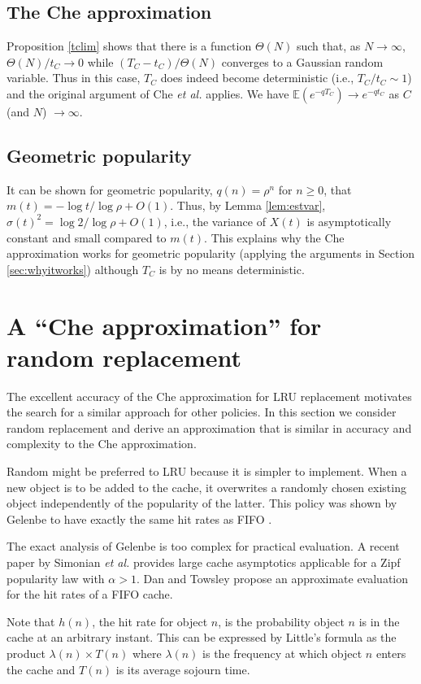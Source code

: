 \documentclass{amsart}
\def\E{{\mathbb E}}
\def\etal{{\em et al. }}
\begin{document}
\subsection{The Che approximation}
Proposition \ref{tclim} shows that there is a function $\Theta(N)$ such that, as $N\to \infty$, $\Theta(N)/t_C \to0$ while $(T_C-t_C)/\Theta(N)$ converges to a Gaussian random variable. Thus in this case, $T_C$ does indeed become deterministic (i.e., $T_C/t_C \sim 1$) and the original argument of Che \etal applies. We have $\E (e^{-qT_C}) \to e^{-qt_C}$ as $C$ (and $N$) $\to \infty$. 

\subsection{Geometric popularity}
It can be shown for geometric popularity, $q(n)=\rho^n$ for $n\ge 0$, that $m(t)=-\log t/ \log \rho+O(1)$. Thus, by Lemma \ref{lem:estvar}, $\sigma(t)^2 = \log 2/ \log \rho +O(1)$, i.e., the variance of $X(t)$ is asymptotically constant and small compared to $m(t)$. This explains why the Che approximation works for geometric popularity (applying the arguments in Section \ref{sec:whyitworks}) although $T_C$ is by no means deterministic. 


\section{A ``Che approximation'' for random replacement}
\label{sec:randomche}
The excellent accuracy of the Che approximation for LRU replacement motivates the search for a similar approach for other policies. In this section we consider random replacement and derive an approximation that is similar in accuracy and complexity to the Che approximation.

Random might be preferred to LRU because it is simpler to implement. When a new object is to be added to the cache, it overwrites a randomly chosen existing object independently of the popularity of the latter. This policy was shown by Gelenbe to have exactly the same hit rates as FIFO  \cite{Gelebe73}.  

The exact analysis of Gelenbe is too complex for practical evaluation. A recent paper by Simonian \etal \cite{KS12} provides large cache asymptotics applicable for a Zipf popularity law with $\alpha>1$. Dan and Towsley  \cite{DT90} propose an approximate evaluation for the hit rates of a FIFO cache.  

Note that $h(n)$, the hit rate for object $n$, is the probability object $n$ is in the cache at an arbitrary instant. This can be expressed by Little's formula as the product $\lambda(n)\times T(n)$ where $\lambda(n)$ is the frequency at which object $n$ enters the cache and $T(n)$ is its average sojourn time. 
\end{document}
